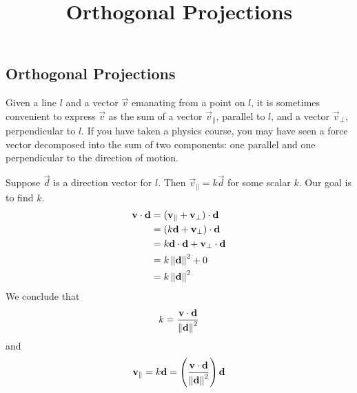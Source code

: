\documentclass{ximera}
\title{Orthogonal Projections} \license{CC BY-NC-SA 4.0}
\begin{document}
\begin{abstract}
 \end{abstract}
\maketitle

\begin{onlineOnly}
\section*{Orthogonal Projections}
\end{onlineOnly}

Given a line $l$ and a vector $\vec{v}$ emanating from a point on $l$, it is sometimes convenient to express $\vec{v}$ as the sum of a vector $\vec{v}_{\parallel}$, parallel to $l$, and a vector $\vec{v}_{\perp}$, perpendicular to $l$.  If you have taken a physics course, you may have seen a force vector decomposed into the sum of two components: one parallel and one perpendicular to the direction of motion.

\begin{center}

\end{center}

Suppose $\vec{d}$ is a direction vector for $l$.  Then $\vec{v}_
{\parallel}=k\vec{d}$ for some scalar $k$.  Our goal is to find $k$.  
\begin{align*}\mathbf{v}\cdot\mathbf{d}&=(\mathbf{v}_{\parallel}+\mathbf{v}_{\perp})\cdot\mathbf{d}\\
&=(k\mathbf{d}+\mathbf{v}_{\perp})\cdot\mathbf{d}\\
&=k\mathbf{d}\cdot\mathbf{d}+\mathbf{v}_{\perp}\cdot\mathbf{d}\\
&=k\left\lVert\mathbf{d}\right\rVert^2+0\\
&=k\left\lVert\mathbf{d}\right\rVert^2
\end{align*}
We conclude that $$k=\frac{\mathbf{v}\cdot\mathbf{d}}{\left\lVert\mathbf{d}\right\rVert^2}$$
and $$\mathbf{v}_{\parallel}=k\mathbf{d}=\left(\frac{\mathbf{v}\cdot\mathbf{d}}{\left\lVert\mathbf{d}\right\rVert^2}\right)\mathbf{d}$$
\end{document}
